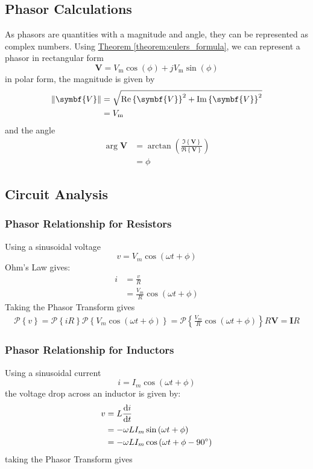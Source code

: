 \documentclass{article}
\begin{document}
\subsection{Phasor Calculations}
As phasors are quantities with a magnitude and angle, they can be represented as complex numbers. 
Using \hyperref[theorem:eulers_formula]{Theorem \ref{theorem:eulers_formula}}, we can represent a phasor in rectangular form
\begin{equation*}
    \symbf{V} = V_{\mathrm{m}} \cos{\left( \phi \right)} + j V_{\mathrm{m}} \sin{\left( \phi \right)}
\end{equation*}
in polar form, the magnitude is given by
\begin{align*}
    \norm{\symbf{V}} &= \sqrt{\Re\left\{ \symbf{V} \right\}^2 + \Im\left\{ \symbf{V} \right\}^2} \\
    &= V_{\mathrm{m}}
\end{align*}
and the angle
\begin{align*}
    \arg{\symbf{V}} &= \arctan{\left( \frac{\Im\left\{ \symbf{V} \right\}}{\Re\left\{ \symbf{V} \right\}} \right)} \\
    &= \phi 
\end{align*}
\subsection{Circuit Analysis}
\subsubsection{Phasor Relationship for Resistors}
Using a sinusoidal voltage
\begin{equation*}
    v = V_m\cos{\left( \omega t + \phi \right)}
\end{equation*}
Ohm's Law gives:
\begin{align*}
    i &= \frac{v}{R} \\
    &= \frac{V_m}{R} \cos{\left( \omega t + \phi \right)}
\end{align*}
Taking the Phasor Transform gives
\begin{align*}
    \mathscr{P}\left\{ v \right\} = \mathscr{P}\left\{ iR \right\}
    \mathscr{P}\left\{ V_m\cos{\left( \omega t + \phi \right)} \right\} = \mathscr{P}\left\{ \frac{V_m}{R} \cos{\left( \omega t + \phi \right)} \right\} R
    \symbf{V} = \symbf{I} R
\end{align*}
\subsubsection{Phasor Relationship for Inductors}
Using a sinusoidal current
\begin{equation*}
    i = I_m\cos{\left( \omega t + \phi \right)}
\end{equation*}
the voltage drop across an inductor is given by:
\begin{align*}
    v &= L \dv{i}{t} \\
    &= -\omega L I_m \sin{\left( \omega t + \phi \right)} \\
    &= -\omega L I_m \cos{\left( \omega t + \phi - \SI{90}{\degree} \right)}
\end{align*}
taking the Phasor Transform gives
\end{document}
